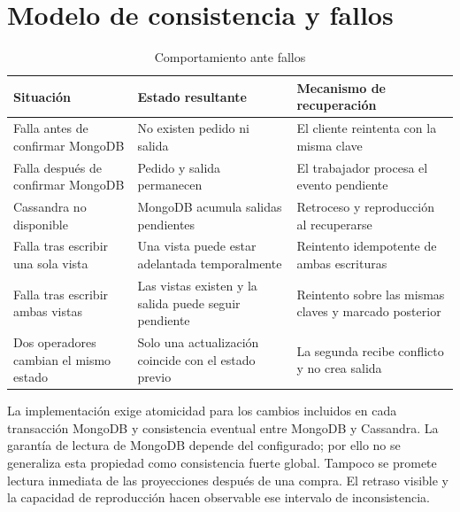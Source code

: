 \section{Modelo de consistencia y fallos}

\begin{table}[H]
  \centering
  \caption{Comportamiento ante fallos}
  \label{tab:fallos}
  \begin{tabularx}{\textwidth}{@{}p{4.3cm}YY@{}}
    \toprule
    \textbf{Situación} & \textbf{Estado resultante} & \textbf{Mecanismo de recuperación} \\
    \midrule
    Falla antes de confirmar MongoDB & No existen pedido ni salida & El cliente reintenta con la misma clave \\
    Falla después de confirmar MongoDB & Pedido y salida permanecen & El trabajador procesa el evento pendiente \\
    Cassandra no disponible & MongoDB acumula salidas pendientes & Retroceso y reproducción al recuperarse \\
    Falla tras escribir una sola vista & Una vista puede estar adelantada temporalmente & Reintento idempotente de ambas escrituras \\
    Falla tras escribir ambas vistas & Las vistas existen y la salida puede seguir pendiente & Reintento sobre las mismas claves y marcado posterior \\
    Dos operadores cambian el mismo estado & Solo una actualización coincide con el estado previo & La segunda recibe conflicto y no crea salida \\
    \bottomrule
  \end{tabularx}
\end{table}

La implementación exige atomicidad para los cambios incluidos en cada transacción MongoDB y consistencia eventual entre MongoDB y Cassandra. La garantía de lectura de MongoDB depende del  configurado; por ello no se generaliza esta propiedad como consistencia fuerte global. Tampoco se promete lectura inmediata de las proyecciones después de una compra. El retraso visible y la capacidad de reproducción hacen observable ese intervalo de inconsistencia.
